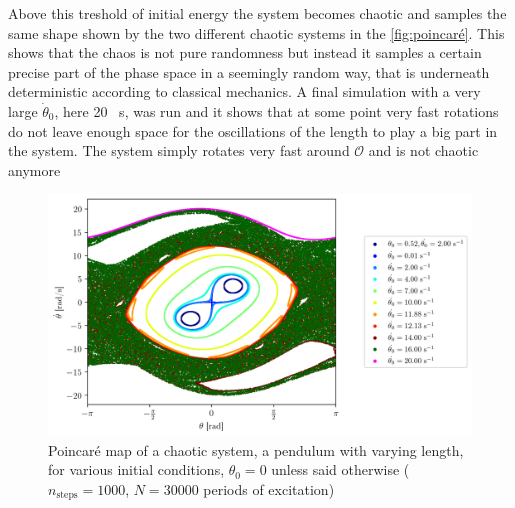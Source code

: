 Above this treshold of initial energy the system becomes chaotic and samples the same shape shown by the two different chaotic systems in the \autoref{fig:poincaré}. This shows that the chaos is not pure randomness but instead it samples a certain precise part of the phase space in a seemingly random way, that is underneath deterministic according to classical mechanics. A final simulation with a very large $\dot\theta_0$, here 20 \si{\per\second}, was run and it shows that at some point very fast rotations do not leave enough space for the oscillations of the length to play a big part in the system. The system simply rotates very fast around $\mathcal{O}$ and is not chaotic anymore
\begin{figure}[H]
    \centering
    \includegraphics[width=\linewidth]{figures/poincare_overkill.png}
    \caption{Poincaré map of a chaotic system, a pendulum with varying length, for various initial conditions, \(\theta_0=0\) unless said otherwise (\(n_\textrm{steps}=1000\), \(N=30 000\) periods of excitation)}
    \label{fig:poincaré}
\end{figure}





